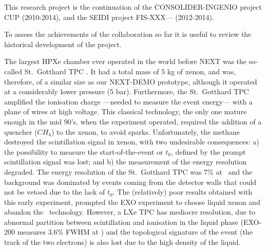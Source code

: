 
%

This research project is the continuation of the CONSOLIDER-INGENIO project CUP (2010-2014), and the SEIDI project FIS-XXX--- (2012-2014). 

To assess the achievements of the collaboration so far it is useful to review the historical development of the project. 

The largest HPXe chamber ever operated in the world before NEXT was the so-called St.~Gotthard TPC \cite{Luscher:1998sd}. It had a total mass of 5 kg of xenon, and was, therefore, of a similar size as our NEXT-DEMO prototype, although it operated at a considerably lower pressure (5 bar). Furthermore, the St.~Gotthard TPC amplified the ionisation charge ---needed to measure the event energy--- with a plane of wires at high voltage. This classical technology, the only one mature enough in the mid 90's, when the experiment operated, required the addition of a quencher ($CH_4$) to the xenon, to avoid sparks. Unfortunately, the methane destroyed the scintillation signal in xenon, with two undesirable consequences: a) the possibility to measure the start-of-the-event or $t_0$, defined by the prompt scintillation signal was lost; and b) the measurement of the energy resolution degraded. The energy resolution of the St.~Gotthard TPC was 7\% at \Qbb\ and the background was dominated by events coming from the detector walls that could not be vetoed due to the lack of $t_0$. The (relatively) poor results obtained with this early experiment, prompted the EXO experiment to choose liquid xenon and abandon the \HPXE\ technology. However, a LXe TPC has mediocre resolution, due to abnormal partition between scintillation and ionisation in the liquid phase (EXO-200 measures 3.6\% FWHM at \Qbb) and the topological signature of the event (the track of the two electrons) is also lost due to the high density of the liquid. 

